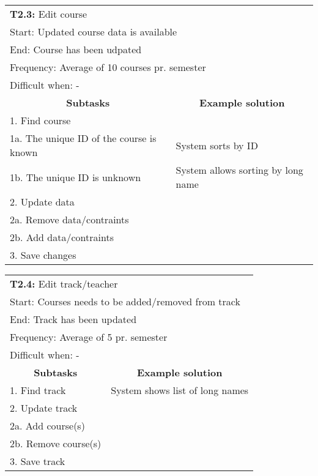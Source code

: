 \newline
\vspace{1cm}
\newline
\begin{tabular}{|p{6cm}|p{6cm}|}
\hline 
	\multicolumn{2}{|l|}{\textbf{T2.3:} \hspace{26mm}Edit course} \\
	\multicolumn{2}{|l|}{Start: \hspace{26mm}Updated course data is available} \\
	\multicolumn{2}{|l|}{End: \hspace{28mm}Course has been udpated} \\
	\multicolumn{2}{|l|}{Frequency: \hspace{17mm}Average of 10 courses pr. semester} \\
	\multicolumn{2}{|l|}{Difficult when: \hspace{10mm} - } \\ \hline
	\multicolumn{1}{|c|}{\textbf{Subtasks}} & \multicolumn{1}{c|}{\textbf{Example solution}} \\ \hline
	1.  Find course & \\
	1a. The unique ID of the course is known & System sorts by ID\\
	1b. The unique ID is unknown & System allows sorting by long name\\ \hline
	2.  Update data & \\ 
	2a. Remove data/contraints & \\
	2b. Add data/contraints & \\\hline
	3.  Save changes & \\ \hline
\end{tabular}
\newline
\vspace{1cm}
\newline
\begin{tabular}{|p{6cm}|p{6cm}|}
\hline 
	\multicolumn{2}{|l|}{\textbf{T2.4:} \hspace{26mm}Edit track/teacher} \\
	\multicolumn{2}{|l|}{Start: \hspace{26mm}Courses needs to be added/removed from track} \\
	\multicolumn{2}{|l|}{End: \hspace{28mm}Track has been updated} \\
	\multicolumn{2}{|l|}{Frequency: \hspace{17mm}Average of 5 pr. semester} \\
	\multicolumn{2}{|l|}{Difficult when: \hspace{10mm} - } \\ \hline
	\multicolumn{1}{|c|}{\textbf{Subtasks}} & \multicolumn{1}{c|}{\textbf{Example solution}} \\ \hline
	1.  Find track & System shows list of long names\\ \hline
	2.  Update track & \\ 
	2a. Add course(s) & \\
	2b. Remove course(s) & \\\hline
	3.  Save track & \\ \hline
\end{tabular}
